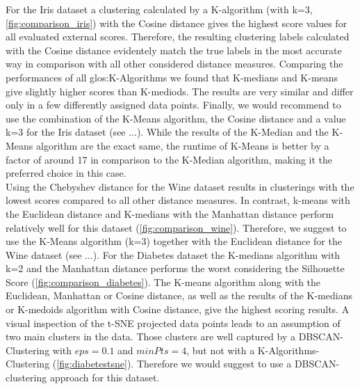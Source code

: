 For the Iris dataset a clustering calculated by a K-algorithm (with k=3, \autoref{fig:comparison_iris}) with the Cosine distance gives the highest score values for all evaluated external scores. Therefore, the resulting clustering labels calculated with the Cosine distance evidentely match the true labels in the most accurate way in comparison with all other considered distance measures. Comparing the performances of all \Gls{glos:K-Algorithms} we found that K-medians and K-means give slightly higher scores than K-mediods. The results are very similar and differ only in a few differently assigned data points.
Finally, we would recommend to use the combination of the K-Means algorithm, the Cosine distance and a value k=3 for the Iris dataset (see ...). While the results of the K-Median and the K-Means algorithm are the exact same, the runtime of K-Means is better by a factor of around 17 in comparison to the K-Median algorithm, making it the preferred choice in this case. \\
Using the Chebyshev distance for the Wine dataset results in clusterings with the lowest scores compared to all other distance measures. In contrast, k-means with the Euclidean distance and K-medians with the Manhattan distance perform relatively well for this dataset (\autoref{fig:comparison_wine}). Therefore, we suggest to use the K-Means algorithm (k=3) together with the Euclidean distance for the Wine dataset (see ...). 
For the Diabetes dataset the K-medians algorithm with k=2 and the Manhattan distance performs the worst considering the Silhouette Score (\autoref{fig:comparison_diabetes}). The K-means algorithm along with the Euclidean, Manhattan or Cosine distance, as well as the results of the K-medians or K-medoids algorithm with Cosine distance, give the highest scoring results. A visual inspection of the t-SNE projected data points leads to an assumption of two main clusters in the data. Those clusters are well captured by a DBSCAN-Clustering with $eps = 0.1$ and $minPts = 4$, but not with a K-Algorithms-Clustering (\autoref{fig:diabetestsne}). Therefore we would suggest to use a DBSCAN-clustering approach for this dataset. 

